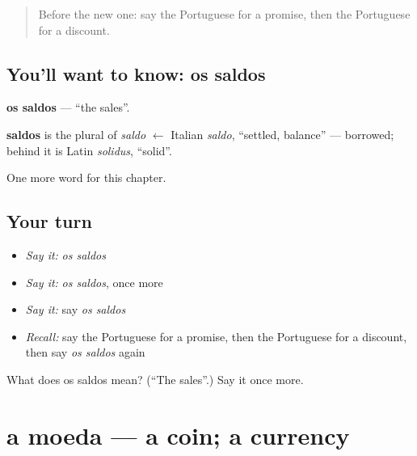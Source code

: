 \label{lesson:PT-C222-saldos}



\begin{quote}
Before the new one: say the Portuguese for a promise, then the Portuguese for a discount.
\end{quote}

\subsection*{You'll want to know: os saldos}
\textbf{os saldos} — \textquotedblleft{}the sales\textquotedblright{}.

\begin{cousinweb}
\textbf{saldos} is the plural of \emph{saldo} $\leftarrow$ Italian \emph{saldo}, \textquotedblleft{}settled, balance\textquotedblright{} — borrowed; behind it is Latin \emph{solidus}, \textquotedblleft{}solid\textquotedblright{}.
\end{cousinweb}

\begin{grammarlens}[title={What you've built}]
One more word for this chapter.
\end{grammarlens}

\subsection*{Your turn}
\begin{itemize}
\raggedright
  \item \emph{Say it:} \emph{os saldos}
  \item \emph{Say it:} \emph{os saldos}, once more
  \item \emph{Say it:} say \emph{os saldos}
  \item \emph{Recall:} say the Portuguese for a promise, then the Portuguese for a discount, then say \emph{os saldos} again
\end{itemize}

\begin{tcolorbox}[breakable,colback=teal!4,colframe=teal!35!black,title={Before you move on}]
What does os saldos mean? (\textquotedblleft{}The sales\textquotedblright{}.) Say it once more.
\end{tcolorbox}
\section[a moeda]{a moeda — a coin; a currency}

\label{lesson:PT-C222-moeda}



